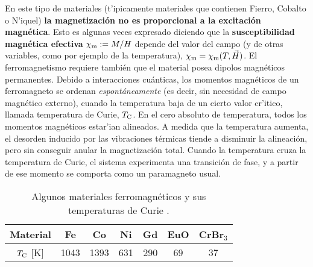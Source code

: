  En este tipo de materiales (t'ipicamente materiales que
contienen Fierro, Cobalto o N'iquel) \textbf{la magnetización no es
proporcional a la excitación magnética}. Esto es algunas veces expresado
diciendo que la \textbf{susceptibilidad magnética efectiva} $\chi_{\rm m}:=M/H$ depende del valor del campo (y de otras variables, como por ejemplo de la temperatura), $\chi_{\rm m}=\chi_{\rm m}(T,\vec{H})$. El ferromagnetismo
requiere también que el material posea dipolos magnéticos permanentes. Debido
a interacciones cuánticas, los momentos magnéticos de un ferromagneto se
ordenan \textit{espontáneamente} (es decir, sin necesidad de campo magnético
externo), cuando la temperatura baja de un cierto valor cr'itico, llamada
temperatura de Curie, $T_{\rm C}$. En el cero absoluto de temperatura, todos los
momentos magnéticos estar'ian alineados. A medida que la temperatura aumenta, el
desorden inducido por las vibraciones térmicas tiende a disminuir la
alineación, pero sin conseguir
anular la magnetización total. Cuando la temperatura cruza la temperatura de
Curie, el sistema experimenta una transición de fase, y a partir de ese
momento se comporta como un paramagneto usual.
\begin{table}[h!]
\begin{center}
\begin{tabular}{c||c|c|c|c|c|c}
Material & Fe & Co & Ni & Gd & EuO & CrBr${}_3$  \\ \hline
$T_{\rm C}$ [K] & 1043 & 1393 & 631 & 290 & 69 & 37
\end{tabular}
\caption{Algunos materiales ferromagnéticos y sus temperaturas de Curie 
\cite{Nolting}.}
\end{center}
\end{table}

